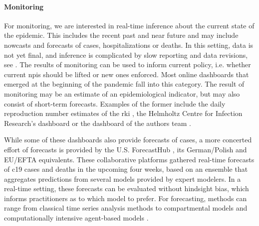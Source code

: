 \paragraph{Monitoring}
For monitoring, we are interested in real-time inference about the current state of the epidemic. This includes the recent past and near future and may include nowcasts and forecasts of cases, hospitalizations or deaths. In this setting, data is not yet final, and inference is complicated by slow reporting and data revisions, see . The results of monitoring can be used to inform current policy, i.e. whether current \glspl{npi} should be lifted or new ones enforced. Most online dashboards that emerged at the beginning of the pandemic fall into this category. The result of monitoring may be an estimate of an epidemiological indicator, but may also consist of short-term forecasts. Examples of the former include the daily reproduction number estimates of the \gls{rki} \citep{AnDerHeiden2020Schatzung}, the Helmholtz Centre for Infection Research's dashboard \citep{Khailaie2021Development} or the dashboard of the authors team \citep{Hotz2020Monitoring}.

While some of these dashboards also provide forecasts of cases, a more concerted effort of forecasts is provided by the U.S. ForecastHub \citep{Ray2020Ensemble}, its German/Polish \citep{Bracher2021Preregistered,Bracher2022National} and EU/EFTA \citep{Sherratt2022Predictive} equivalents. These collaborative platforms gathered real-time forecasts of \gls{c19} cases and deaths in the upcoming four weeks, based on an ensemble that aggregates predictions from several models provided by expert modelers. In a real-time setting, these forecasts can be evaluated without hindsight bias, which informs practitioners as to which model to prefer. 
For forecasting, methods can range from classical time series analysis methods \citep{Arroyo-Marioli2021Tracking} to compartmental models \citep{Khailaie2021Development} and computationally intensive agent-based models \citep{Adamik2020Mitigation}.

